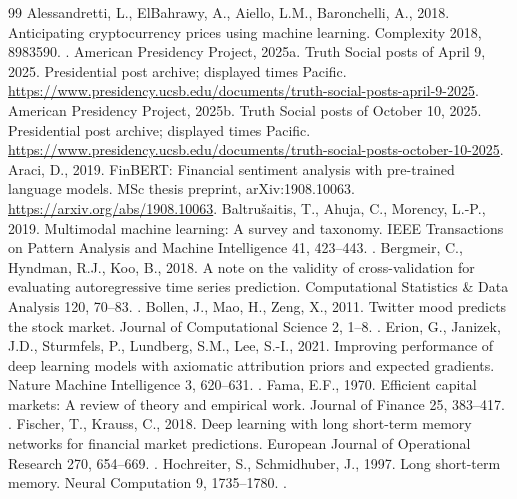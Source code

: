 \FloatBarrier
\begin{thebibliography}{99}
 Alessandretti, L., ElBahrawy, A., Aiello, L.M., Baronchelli, A., 2018. Anticipating cryptocurrency prices using machine learning. Complexity 2018, 8983590. .
 American Presidency Project, 2025a. Truth Social posts of April 9, 2025. Presidential post archive; displayed times Pacific. \url{https://www.presidency.ucsb.edu/documents/truth-social-posts-april-9-2025}.
 American Presidency Project, 2025b. Truth Social posts of October 10, 2025. Presidential post archive; displayed times Pacific. \url{https://www.presidency.ucsb.edu/documents/truth-social-posts-october-10-2025}.
 Araci, D., 2019. FinBERT: Financial sentiment analysis with pre-trained language models. MSc thesis preprint, arXiv:1908.10063. \url{https://arxiv.org/abs/1908.10063}.
 Baltru\v{s}aitis, T., Ahuja, C., Morency, L.-P., 2019. Multimodal machine learning: A survey and taxonomy. IEEE Transactions on Pattern Analysis and Machine Intelligence 41, 423--443. .
 Bergmeir, C., Hyndman, R.J., Koo, B., 2018. A note on the validity of cross-validation for evaluating autoregressive time series prediction. Computational Statistics \& Data Analysis 120, 70--83. .
 Bollen, J., Mao, H., Zeng, X., 2011. Twitter mood predicts the stock market. Journal of Computational Science 2, 1--8. .
 Erion, G., Janizek, J.D., Sturmfels, P., Lundberg, S.M., Lee, S.-I., 2021. Improving performance of deep learning models with axiomatic attribution priors and expected gradients. Nature Machine Intelligence 3, 620--631. .
 Fama, E.F., 1970. Efficient capital markets: A review of theory and empirical work. Journal of Finance 25, 383--417. .
 Fischer, T., Krauss, C., 2018. Deep learning with long short-term memory networks for financial market predictions. European Journal of Operational Research 270, 654--669. .
 Hochreiter, S., Schmidhuber, J., 1997. Long short-term memory. Neural Computation 9, 1735--1780. .

\end{thebibliography}
